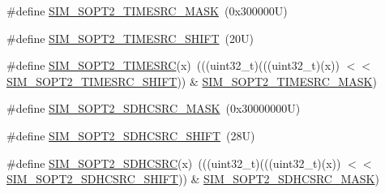 \begin{DoxyCompactItemize}
\item 
\#define \mbox{\hyperlink{group___s_i_m___register___masks_gab50a6e7eaa3b552b96f8cd0450a95395}{S\+I\+M\+\_\+\+S\+O\+P\+T2\+\_\+\+T\+I\+M\+E\+S\+R\+C\+\_\+\+M\+A\+SK}}~(0x300000\+U)
\item 
\#define \mbox{\hyperlink{group___s_i_m___register___masks_ga808182bbe91aa5fedaede7122e4af1aa}{S\+I\+M\+\_\+\+S\+O\+P\+T2\+\_\+\+T\+I\+M\+E\+S\+R\+C\+\_\+\+S\+H\+I\+FT}}~(20\+U)
\item 
\#define \mbox{\hyperlink{group___s_i_m___register___masks_gaf2c6b0c71d3139118270e0ded3521f53}{S\+I\+M\+\_\+\+S\+O\+P\+T2\+\_\+\+T\+I\+M\+E\+S\+RC}}(x)~(((uint32\+\_\+t)(((uint32\+\_\+t)(x)) $<$$<$ \mbox{\hyperlink{group___s_i_m___register___masks_ga808182bbe91aa5fedaede7122e4af1aa}{S\+I\+M\+\_\+\+S\+O\+P\+T2\+\_\+\+T\+I\+M\+E\+S\+R\+C\+\_\+\+S\+H\+I\+FT}})) \& \mbox{\hyperlink{group___s_i_m___register___masks_gab50a6e7eaa3b552b96f8cd0450a95395}{S\+I\+M\+\_\+\+S\+O\+P\+T2\+\_\+\+T\+I\+M\+E\+S\+R\+C\+\_\+\+M\+A\+SK}})
\item 
\#define \mbox{\hyperlink{group___s_i_m___register___masks_gadfe4a9ff5d8ba836d827d0d265dc3055}{S\+I\+M\+\_\+\+S\+O\+P\+T2\+\_\+\+S\+D\+H\+C\+S\+R\+C\+\_\+\+M\+A\+SK}}~(0x30000000\+U)
\item 
\#define \mbox{\hyperlink{group___s_i_m___register___masks_gac0d4558ce58c6d9bf19af4f36c363562}{S\+I\+M\+\_\+\+S\+O\+P\+T2\+\_\+\+S\+D\+H\+C\+S\+R\+C\+\_\+\+S\+H\+I\+FT}}~(28\+U)
\item 
\#define \mbox{\hyperlink{group___s_i_m___register___masks_ga1e15b52db62a3ffff08350dc9c6f590d}{S\+I\+M\+\_\+\+S\+O\+P\+T2\+\_\+\+S\+D\+H\+C\+S\+RC}}(x)~(((uint32\+\_\+t)(((uint32\+\_\+t)(x)) $<$$<$ \mbox{\hyperlink{group___s_i_m___register___masks_gac0d4558ce58c6d9bf19af4f36c363562}{S\+I\+M\+\_\+\+S\+O\+P\+T2\+\_\+\+S\+D\+H\+C\+S\+R\+C\+\_\+\+S\+H\+I\+FT}})) \& \mbox{\hyperlink{group___s_i_m___register___masks_gadfe4a9ff5d8ba836d827d0d265dc3055}{S\+I\+M\+\_\+\+S\+O\+P\+T2\+\_\+\+S\+D\+H\+C\+S\+R\+C\+\_\+\+M\+A\+SK}})
\end{DoxyCompactItemize}
